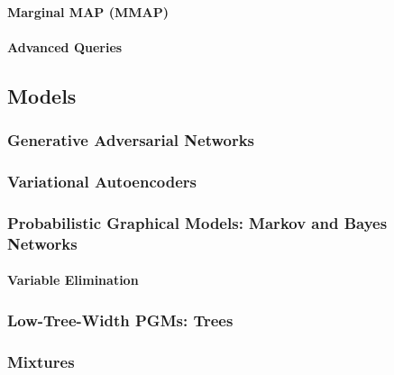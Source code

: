 			\paragraph{Marginal MAP (MMAP)} %

			\paragraph{Advanced Queries} %

		\subsection{Models} %

			\subsubsection{Generative Adversarial Networks} %

			\subsubsection{Variational Autoencoders} %

			\subsubsection{Probabilistic Graphical Models: Markov and Bayes Networks} %

				\paragraph{Variable Elimination} %

			\subsubsection{Low-Tree-Width PGMs: Trees} %

			\subsubsection{Mixtures} %

